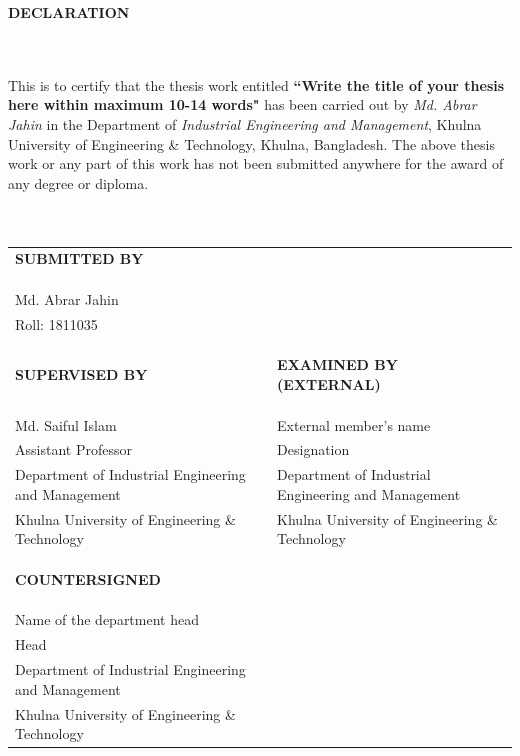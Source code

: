\documentclass[a4paper,12pt,oneside]{book}
\newcommand{\blanklineR}{\hfill \\} %
\newcommand{\HeadingR}[1]{%
{\large			%
\bfseries{#1}}}
\newcommand{\titleR}{Write the title of your thesis here within maximum 10-14 words} %
\begin{document}
\begin{center}
\HeadingR{DECLARATION}
\end{center}
\blanklineR
\blanklineR
This is to certify that the thesis work entitled \textbf{``\titleR"} has been carried out by \textit{Md. Abrar Jahin} in the Department of \textit{Industrial Engineering and Management}, Khulna University of Engineering \& Technology, Khulna, Bangladesh. The above thesis work or any part of this work has not been submitted anywhere for the award of any degree or diploma.
\blanklineR\blanklineR\blanklineR
\begin{table}[!h]
\centering
\footnotesize
\begin{tabular}{ll}
\textbf{SUBMITTED BY} &  \\
 &  \\
 &  \\
 &  \\
Md. Abrar Jahin &  \\
Roll: 1811035 &  \\
 &  \\
 &  \\
 &  \\
\textbf{SUPERVISED BY} & \textbf{EXAMINED BY (EXTERNAL)} \\
 &  \\
 &  \\
 &  \\
Md. Saiful Islam & External member's name \\
Assistant Professor & Designation \\
Department of Industrial Engineering and
  Management & Department of Industrial Engineering and Management \\
Khulna University of Engineering \&
  Technology & Khulna University of Engineering \& Technology \\
 &  \\
 &  \\
 &  \\
\textbf{COUNTERSIGNED} &  \\
 &  \\
 &  \\
 &  \\
Name of the department head &  \\
Head &  \\
Department of Industrial Engineering and
  Management &  \\
Khulna University of Engineering \&
  Technology & 
\end{tabular}
\end{table}
\end{document}
